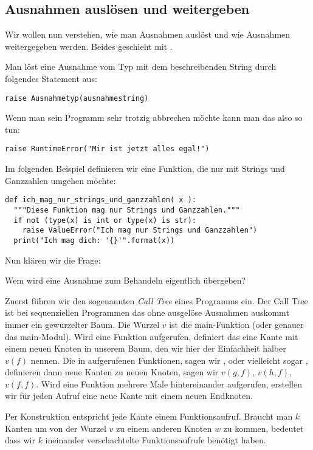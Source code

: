 \subsection{Ausnahmen auslösen und weitergeben}
\label{section:ausnahmen:ausnahmen_ausloesen}
Wir wollen nun verstehen, wie man Ausnahmen auslöst und wie Ausnahmen weitergegeben werden.
Beides geschieht mit .

Man löst eine Ausnahme vom Typ  mit dem beschreibenden String  durch folgendes Statement aus:
\begin{lstlisting}
raise Ausnahmetyp(ausnahmestring)
\end{lstlisting}
Wenn man sein Programm sehr trotzig abbrechen möchte kann man das also so tun:
\begin{lstlisting}
raise RuntimeError("Mir ist jetzt alles egal!")
\end{lstlisting}
Im folgenden Beispiel definieren wir eine Funktion, die nur mit Strings und Ganzzahlen umgehen möchte:
\begin{lstlisting}
def ich_mag_nur_strings_und_ganzzahlen( x ):
  """Diese Funktion mag nur Strings und Ganzzahlen."""
  if not (type(x) is int or type(x) is str):
    raise ValueError("Ich mag nur Strings und Ganzzahlen")
  print("Ich mag dich: '{}'".format(x))
\end{lstlisting}

Nun klären wir die Frage:
\begin{center}
  Wem wird eine Ausnahme zum Behandeln eigentlich übergeben?
\end{center}
Zuerst führen wir den sogenannten \emph{Call Tree} eines Programms ein.
Der Call Tree ist bei sequenziellen Programmen das ohne ausgelöse Ausnahmen auskommt immer ein gewurzelter Baum.
Die Wurzel $v$ ist die main-Funktion (oder genauer das main-Modul).
Wird eine Funktion  aufgerufen, definiert das eine Kante mit einem neuen Knoten in unserem Baum, den wir hier der Einfachheit halber $v(f)$ nennen.
Die in  aufgerufenen Funktionen, sagen wir ,  oder vielleicht sogar , definieren dann neue Kanten zu neuen Knoten, sagen wir $v(g,f)$, $v(h,f)$, $v(f,f)$.
Wird eine Funktion  mehrere Male hintereinander aufgerufen, erstellen wir für jeden Aufruf eine neue Kante mit einem neuen Endknoten.

Per Konstruktion entspricht jede Kante einem Funktionsaufruf.
Braucht man $k$ Kanten um von der Wurzel $v$ zu einem anderen Knoten $w$ zu kommen, bedeutet dass wir $k$ ineinander verschachtelte Funktionsaufrufe benötigt haben.

